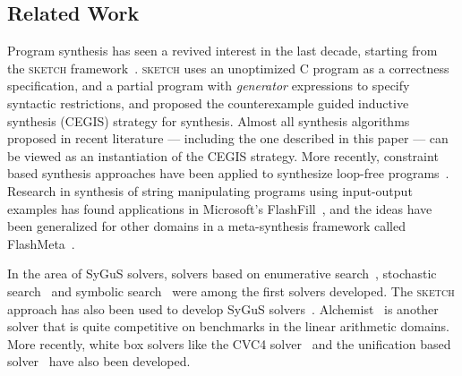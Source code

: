 \documentclass{llncs}
\newcommand{\sygus}{{\sffamily\fontsize{8.5}{10}\selectfont
    SyGuS}\xspace}
\newcommand{\sketch}{\textsc{sketch}\xspace}
\begin{document}
\subsection{Related Work}
Program synthesis has seen a revived interest in the last decade,
starting from the \sketch
framework~\cite{solar-lezama-05,solar-lezama-06}. \sketch uses an
unoptimized C program as a correctness specification, and a partial
program with \emph{generator} expressions to specify syntactic
restrictions, and proposed the counterexample guided inductive
synthesis (CEGIS) strategy for synthesis. Almost all synthesis
algorithms proposed in recent literature --- including the one
described in this paper --- can be viewed as an instantiation of the
CEGIS strategy.  More recently, constraint based synthesis approaches
have been applied to synthesize loop-free programs~\cite{jha-10,
gulwani-pldi-11}. Research in synthesis of string manipulating
programs using input-output examples has found applications in
Microsoft's FlashFill~\cite{gulwani-popl-11}, and the ideas have been
generalized for other domains in a meta-synthesis framework called
FlashMeta~\cite{polozov-15}.

In the area of \sygus solvers, solvers based on enumerative
search~\cite{udupa-transit}, stochastic
search~\cite{schkufza-13,udupa-sygus} and symbolic
search~\cite{gulwani-pldi-11} were among the first solvers
developed. The \sketch approach has also been used to develop \sygus
solvers~\cite{jeon-15}. Alchemist~\cite{saha-15} is another solver
that is quite competitive on benchmarks in the linear arithmetic
domains. More recently, white box solvers like the CVC4
solver~\cite{reynolds-15} and the unification based
solver~\cite{alur-15} have also been developed.
\end{document}

